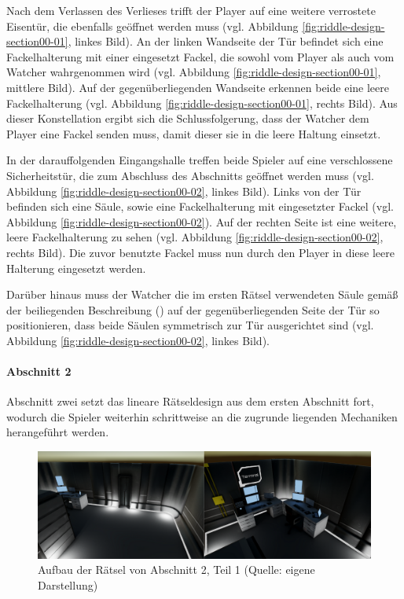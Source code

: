 Nach dem Verlassen des Verlieses trifft der Player auf eine weitere verrostete Eisentür, die ebenfalls geöffnet werden muss (vgl. Abbildung \ref{fig:riddle-design-section00-01}, linkes Bild). An der linken Wandseite der Tür befindet sich eine Fackelhalterung mit einer eingesetzt Fackel, die sowohl vom Player als auch vom Watcher wahrgenommen wird (vgl. Abbildung \ref{fig:riddle-design-section00-01}, mittlere Bild). Auf der gegenüberliegenden Wandseite erkennen beide eine leere Fackelhalterung (vgl. Abbildung \ref{fig:riddle-design-section00-01}, rechts Bild). Aus dieser Konstellation ergibt sich die Schlussfolgerung, dass der Watcher dem Player eine Fackel senden muss, damit dieser sie in die leere Haltung einsetzt.

In der darauffolgenden Eingangshalle treffen beide Spieler auf eine verschlossene Sicherheitstür, die zum Abschluss des Abschnitts geöffnet werden muss (vgl. Abbildung \ref{fig:riddle-design-section00-02}, linkes Bild). Links von der Tür befinden sich eine Säule, sowie eine Fackelhalterung mit eingesetzter Fackel (vgl. Abbildung \ref{fig:riddle-design-section00-02}). Auf der rechten Seite ist eine weitere, leere Fackelhalterung zu sehen (vgl. Abbildung \ref{fig:riddle-design-section00-02}, rechts Bild). Die zuvor benutzte Fackel muss nun durch den Player in diese leere Halterung eingesetzt werden.

Darüber hinaus muss der Watcher die im ersten Rätsel verwendeten Säule gemäß der beiliegenden Beschreibung () auf der gegenüberliegenden Seite der Tür so positionieren, dass beide Säulen symmetrisch zur Tür ausgerichtet sind (vgl. Abbildung \ref{fig:riddle-design-section00-02}, linkes Bild).

\paragraph{Abschnitt 2}

Abschnitt zwei setzt das lineare Rätseldesign aus dem ersten Abschnitt fort, wodurch die Spieler weiterhin schrittweise an die zugrunde liegenden Mechaniken herangeführt werden.

\begin{figure}[ht]
\centering
\includegraphics[width=1\linewidth]{content/pictures/Rätseldesign - Abschnitt01 - Rätsel00.png}
\caption{Aufbau der Rätsel von Abschnitt 2, Teil 1 (Quelle: eigene Darstellung)}
\label{fig:riddle-design-section01-00}
\end{figure}

